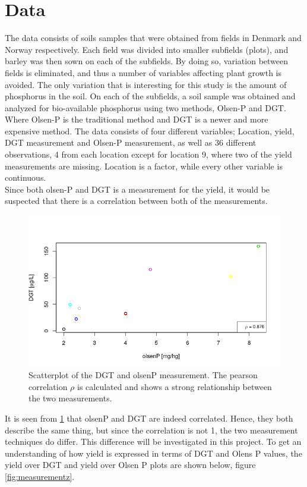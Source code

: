 \documentclass[11pt, fleqn, titlepage]{article}
\begin{document}
\section{Data}
\noindent
The data consists of soils samples that were obtained from fields in Denmark and Norway respectively. Each field was divided into smaller subfields (plots), and barley was then sown on each of the subfields. By doing so, variation between fields is eliminated, and thus a number of variables affecting plant growth is avoided. The only variation that is interesting for this study is the amount of phosphorus in the soil. On each of the subfields, a soil sample was obtained and analyzed for bio-available phosphorus using two methods, Olsen-P and DGT. Where Olsen-P is the traditional method and DGT is a newer and more expensive method. The data consists of four different variables; Location, yield, DGT measurement and Olsen-P measurement, as well as 36 different observations, 4 from each location except for location 9, where two of the yield measurements are missing. Location is a factor, while every other variable is continuous.
\\ \noindent 
Since both olsen-P and DGT is a measurement for the yield, it would be suspected that there is a correlation between both of the measurements. 
\begin{figure}[H]
	\centering
	\includegraphics[width=0.7\linewidth]{billeder/dgtolsencor.png}
	\caption{Scatterplot of the DGT and olsenP measurement. The pearson correlation $ \rho $ is calculated and shows a strong relationship between the two measurements.}
	\label{fig:dgtolsencor}
\end{figure}
\noindent It is seen from \ref{fig:dgtolsencor} that olsenP and DGT are indeed correlated. Hence, they both describe the same thing, but since the correlation is not 1, the two measurement techniques do differ. This difference will be investigated in this project. To get an understanding of how yield is expressed in terms of DGT and Olens P values, the yield over DGT and yield over Olsen P plots are shown below, figure \ref{fig:measurementz}. 
\end{document}
